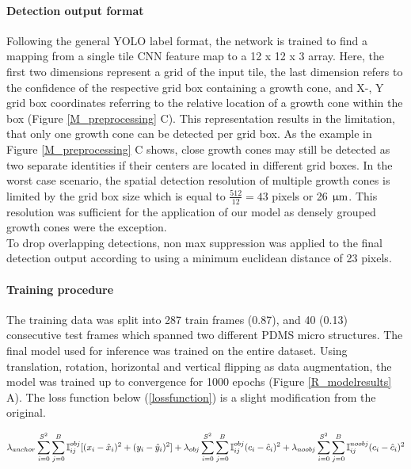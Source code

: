 \paragraph{Detection output format}
Following the general YOLO label format, the network is trained to find a
mapping from a single tile CNN feature map to a 12 x 12 x 3 array. Here, the
first two dimensions represent a grid of the input tile, the last dimension
refers to the confidence of the respective grid box containing a growth cone,
and X-, Y grid box coordinates referring to the relative location of a growth
cone within the box (Figure \ref{M_preprocessing} C). This representation
results in the limitation, that only one growth cone can be detected per grid
box. As the example in Figure \ref{M_preprocessing} C shows, close growth cones
may still be detected as two separate identities if their centers are located in
different grid boxes. In the worst case scenario, the spatial detection
resolution of multiple growth cones is limited by the grid box size which is
equal to $\frac{512}{12} = 43$  pixels or 26 $\rm \upmu m$. This resolution was
sufficient for the application of our model as densely grouped growth cones were
the exception. \\
To drop overlapping detections, non max suppression was applied to the final
detection output according to \parencite{nms} using a minimum euclidean distance
of 23 pixels.

\paragraph{Training procedure}
The training data was split into 287 train frames (0.87), and 40 (0.13)
consecutive test frames which spanned two different PDMS micro structures. The
final model used for inference was trained on the entire dataset. Using
translation, rotation, horizontal and vertical flipping as data augmentation,
the model was trained up to convergence for 1000 epochs (Figure
\ref{R_modelresults} A). The loss function below (\ref{lossfunction}) is a
slight modification from the original.

\begin{equation}
    \lambda_{anchor}\sum_{i=0}^{S^2}\sum_{j=0}^B \mathbb{I}_{ij}^{obj}[(x_i-\hat{x}_i)^2 + (y_i-\hat{y}_i)^2 ] \\
    + \lambda_{obj}\sum_{i=0}^{S^2}\sum_{j=0}^B \mathbb{I}_{ij}^{obj}(c_i - \hat{c}_i)^2 \\
    + \lambda_{noobj}\sum_{i=0}^{S^2}\sum_{j=0}^B \mathbb{I}_{ij}^{noobj}(c_i - \hat{c}_i)^2 \\
    \label{lossfunction}
\end{equation}

